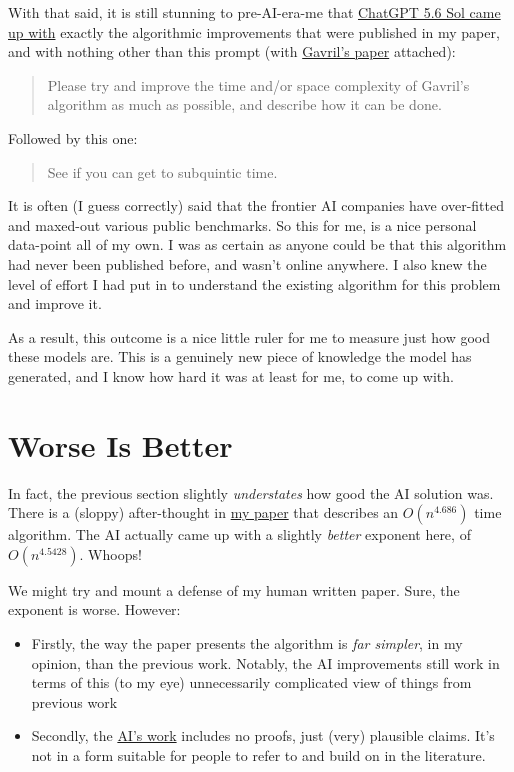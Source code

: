 \documentclass[11pt]{article}
\newenvironment{promptbox}{\begin{quote}}{\end{quote}}
\begin{document}
With that said, it is still stunning to pre-AI-era-me that \href{https://chatgpt.com/share/6a8434d4-c278-83ed-aeb1-f2f0cd1bdb62}{ChatGPT 5.6 Sol came up with} exactly the algorithmic improvements that were published in my paper,
and with nothing other than this prompt (with \href{https://doi.org/10.1016/j.ipl.2007.12.003}{Gavril's paper} attached):

\begin{promptbox}
Please try and improve the time and/or space complexity of Gavril's algorithm as much as possible, and describe how it can be done.
\end{promptbox}

Followed by this one:

\begin{promptbox}
See if you can get to subquintic time.
\end{promptbox}

It is often (I guess correctly) said that the frontier AI companies have over-fitted and maxed-out various public benchmarks. So this for me, is a nice personal data-point all of my own.
I was as certain as anyone could be that this algorithm had never been published before, and wasn't online anywhere.
I also knew the level of effort I had put in to understand the existing algorithm for this problem and improve it.

As a result, this outcome is a nice little ruler for me to measure just how good these models are.
This is a genuinely new piece of knowledge the model has generated, and I know how hard it was at least for me, to come up with.

\section{Worse Is Better}

In fact, the previous section slightly \textit{understates} how good the AI solution was. There is a (sloppy) after-thought in \href{https://doi.org/10.7155/jgaa.v30i1.3137}{my paper} that describes an $O(n^{4.686})$ time
algorithm. The AI actually came up with a slightly \textit{better} exponent here, of $O(n^{4.5428})$. Whoops!

We might try and mount a defense of my human written paper. Sure, the exponent is worse. However:

\begin{itemize}
\item Firstly, the way the paper presents the algorithm is \textit{far simpler}, in my opinion, than the previous work.
      Notably, the AI improvements still work in terms of this (to my eye) unnecessarily complicated view of things from previous work
\item Secondly, the \href{https://chatgpt.com/share/6a8434d4-c278-83ed-aeb1-f2f0cd1bdb62}{AI's work} includes no proofs, just (very) plausible claims. It's not in a form suitable for people to refer to and build on in the literature.
\end{itemize}
\end{document}
